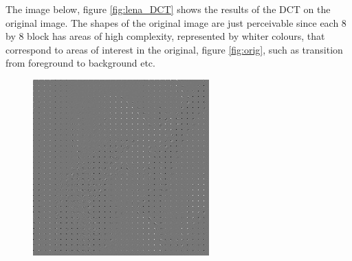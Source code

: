 		The image below, figure \ref{fig:lena_DCT} shows the results of the DCT on the original image. The shapes of the original image are just perceivable since each 8 by 8 block has areas of high complexity, represented by whiter colours, that correspond to areas of interest in the original, figure \ref{fig:orig}, such as transition from foreground to background etc.
		\begin{figure}[ht]
			\centering
			\begin{minipage}[c]{0.45\linewidth}
				\centering
			 	\includegraphics[width=\textwidth]{DCT_lena.jpg}
			\end{minipage}
			\begin{minipage}[c]{0.45\linewidth}
				\centering

\end{minipage}
\end{figure}
